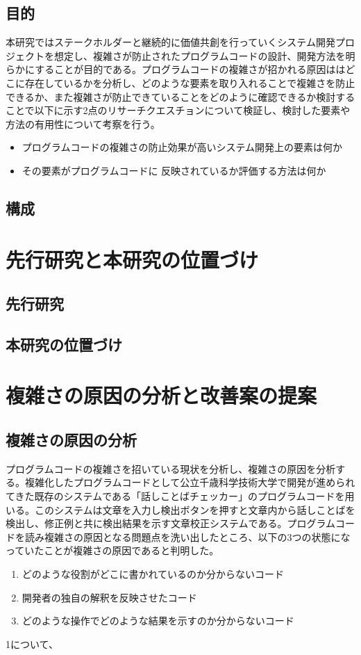 \documentclass[11pt, a4paper]{jreport}
\begin{document}
\section{目的}
本研究ではステークホルダーと継続的に価値共創を行っていくシステム開発プロジェクトを想定し、複雑さが防止されたプログラムコードの設計、開発方法を明らかにすることが目的である。プログラムコードの複雑さが招かれる原因ははどこに存在しているかを分析し、どのような要素を取り入れることで複雑さを防止できるか、また複雑さが防止できていることをどのように確認できるか検討することで以下に示す2点のリサーチクエスチョンについて検証し、検討した要素や方法の有用性について考察を行う。
\begin{itemize}
\item プログラムコードの複雑さの防止効果が高いシステム開発上の要素は何か
\item その要素がプログラムコードに
反映されているか評価する方法は何か
\end{itemize}
\section{構成}

\chapter{先行研究と本研究の位置づけ}
\section{先行研究}
\subsection{}
\subsection{}
\section{本研究の位置づけ}
\chapter{複雑さの原因の分析と改善案の提案}
\section{複雑さの原因の分析}
プログラムコードの複雑さを招いている現状を分析し、複雑さの原因を分析する。複雑化したプログラムコードとして公立千歳科学技術大学で開発が進められてきた既存のシステムである「話しことばチェッカー」のプログラムコードを用いる。このシステムは文章を入力し検出ボタンを押すと文章内から話しことばを検出し、修正例と共に検出結果を示す文章校正システムである。プログラムコードを読み複雑さの原因となる問題点を洗い出したところ、以下の3つの状態になっていたことが複雑さの原因であると判明した。
\begin{enumerate}
\item どのような役割がどこに書かれているのか分からないコード
\item 開発者の独自の解釈を反映させたコード
\item どのような操作でどのような結果を示すのか分からないコード
\end{enumerate}
1について、
\end{document}

